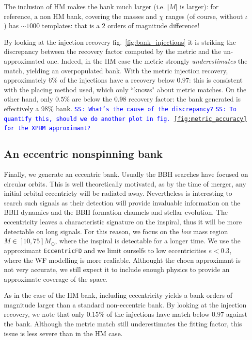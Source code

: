 \documentclass[twocolumn,showpacs,preprintnumbers,nofootinbib,prd,
superscriptaddress,10pt]{revtex4-2}
\newcommand{\stefano}[1]{{\textcolor{blue}{\texttt{SS: #1}} }}
\begin{document}
The inclusion of HM makes the bank much larger (i.e. $|M|$ is larger): for reference, a non HM bank, covering the masses and $\chi$ ranges (of course, without $\iota$) has $\sim 1000$ templates: that is a 2 orders of magnitude difference!

By looking at the injection recovery fig.~\ref{fig:bank_injections} it is striking the discrepancy between the recovery factor computed by the metric and the un-approximated one. Indeed, in the HM case the metric strongly {\it underestimates} the match, yielding an overpopulated bank. With the metric injection recovery, approximately $6\%$ of the injections have a recovery below $0.97$: this is consistent with the placing method used, which only ``knows" about metric matches. On the other hand, only $0.5\%$ are below the $0.98$ recovery factor: the bank generated is effectively a $98\%$ bank.
\stefano{What's the cause of the discrepancy?}
\stefano{To quantify this, should we do another plot in fig.~\ref{fig:metric_accuracy} for the XPHM approximant?}


\subsection{An eccentric nonspinning bank}\label{sec:eccentric_bank}

Finally, we generate an eccentric bank. Usually the BBH searches have focused on circular orbits.
This is well theoretically motivated, as by the time of merger, any initial orbital eccentricty will be radiated away. Nevertheless is interesting to search such signals as their detection will provide invaluable information on the BBH dynamics and the BBH formation channels and stellar evolution.
The eccentricity leaves a characteristic signature on the inspiral, thus it will be more detectable on long signals. For this reason, we focus on the {\it low} mass region $M\in [10,75] M_\odot$, where the inspiral is detectable for a longer time.
We use the approximant \texttt{EccentricFD} and we limit ourselfs to low eccentricities $e<0.3$, where the WF modelling is more realiable. Althought the choen approximant is not very accurate, we still expect it to include enough physics to provide an approximate coverage of the space.

As in the case of the HM bank, including eccentricity yields a bank orders of magnitude larger than a standard non-eccentric bank.
By looking at the injection recovery, we note that only $0.15\%$ of the injections have match below $0.97$ against the bank. Although the metric match still underestimates the fitting factor, this issue is less severe than in the HM case.
\end{document}
